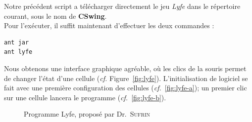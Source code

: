 \documentclass[a4paper,11pt,french]{report}
\begin{document}
Notre précédent script a télécharger directement le jeu \emph{Lyfe} dans le répertoire courant, sous le nom de \textbf{CSwing}.\\
Pour l'exécuter, il suffit maintenant d'effectuer les deux commandes :

\begin{verbatim}
ant jar
ant lyfe
\end{verbatim}

Nous obtenons une interface graphique agréable, où les clics de la souris permet de changer l'état d'une cellule (\emph{cf.} Figure~\vref{fig:lyfe}). L'initialisation de logiciel se fait avec une première configuration des cellules (\emph{cf.}~\vref{fig:lyfe-a}); un premier clic sur une cellule lancera le programme (\emph{cf.}~\vref{fig:lyfe-b}).

\begin{figure}[htp]
  \centering
  \vspace{1pt}               
  \caption{Programme Lyfe, proposé par Dr.\ \textsc{Sufrin}}
  \label{fig:lyfe}
\end{figure}
\end{document}
